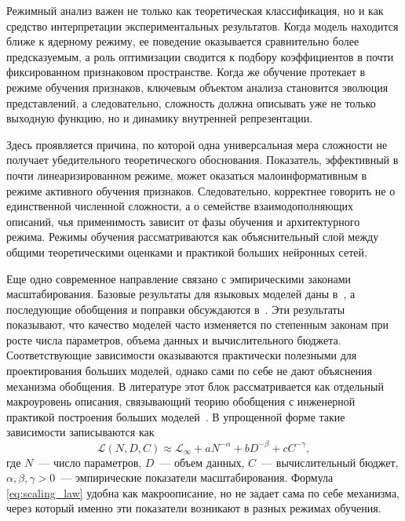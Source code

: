 \documentclass[russian]{intsys}
\begin{document}
Режимный анализ важен не только как теоретическая классификация, но и как средство интерпретации экспериментальных результатов.
Когда модель находится ближе к ядерному режиму, ее поведение оказывается сравнительно более предсказуемым, а роль оптимизации сводится к подбору коэффициентов в почти фиксированном признаковом пространстве.
Когда же обучение протекает в режиме обучения признаков, ключевым объектом анализа становится эволюция представлений, а следовательно, сложность должна описывать уже не только выходную функцию, но и динамику внутренней репрезентации.

Здесь проявляется причина, по которой одна универсальная мера сложности не получает убедительного теоретического обоснования.
Показатель, эффективный в почти линеаризированном режиме, может оказаться малоинформативным в режиме активного обучения признаков.
Следовательно, корректнее говорить не о единственной численной сложности, а о семействе взаимодополняющих описаний, чья применимость зависит от фазы обучения и архитектурного режима.
Режимы обучения рассматриваются как объяснительный слой между общими теоретическими оценками и практикой больших нейронных сетей.

Еще одно современное направление связано с эмпирическими законами масштабирования. Базовые результаты для языковых моделей даны в~\cite{kaplan2020scaling,hoffman2022training}, а последующие обобщения и поправки обсуждаются в~\cite{meta2024survey,beyondChinchillaInference2023}.
Эти результаты показывают, что качество моделей часто изменяется по степенным законам при росте числа параметров, объема данных и вычислительного бюджета.
Соответствующие зависимости оказываются практически полезными для проектирования больших моделей, однако сами по себе не дают объяснения механизма обобщения.
В литературе этот блок рассматривается как отдельный макроуровень описания, связывающий теорию обобщения с инженерной практикой построения больших моделей~\cite{hu2021complexitysurvey,recent2020theory,belkin2021overview}.
В упрощенной форме такие зависимости записываются как
\begin{equation}
\mathcal L(N,D,C)\approx
\mathcal L_{\infty}+aN^{-\alpha}+bD^{-\beta}+cC^{-\gamma},
\label{eq:scaling_law}
\end{equation}
где $N$~--- число параметров, $D$~--- объем данных, $C$~--- вычислительный бюджет, $\alpha,\beta,\gamma>0$~--- эмпирические показатели масштабирования. Формула \eqref{eq:scaling_law} удобна как макроописание, но не задает сама по себе механизма, через который именно эти показатели возникают в разных режимах обучения.
\end{document}
